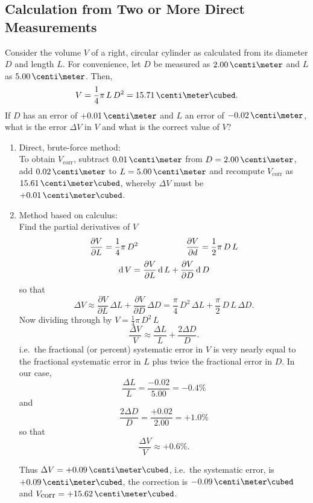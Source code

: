 \subsection{Calculation from Two or More Direct Measurements}

Consider the volume $V$ of a right, circular cylinder as calculated from its diameter $D$ and length $L$. For convenience, let $D$ be measured as $2.00\,\centi\meter$  and $L$ as $5.00\,\centi\meter$. Then,
\[
  V = \frac{1}{4} \pi \, L \, D^2 = 15.71\,\centi\meter\cubed.
\]
If $D$ has an error of $+0.01\,\centi\meter$ and $L$ an error of $-0.02\,\centi\meter$, what is the error $\Delta V$ in $V$ and what is the correct value of $V$?
\begin{enumerate}
\item Direct, brute-force method:\\
  To obtain $V_{\mbox{corr}}$, subtract $0.01\,\centi\meter$ from $D = 2.00\,\centi\meter$, add $0.02\,\centi\meter$ to $L = 5.00\,\centi\meter$ and recompute $V_{\mbox{corr}}$ as $15.61\,\centi\meter\cubed$, whereby $\Delta V$ must be $+0.01\,\centi\meter\cubed$.

\item Method based on calculus:\\
  Find the partial derivatives of $V$
  \[
    \frac{\partial V}{\partial L} =\frac{1}{4} \pi \, D^2   \hspace{2 cm}   \frac{\partial V}{\partial d} =\frac{1}{2} \pi \, D \, L
  \]
  \[
    {\rm d}\, V = \frac{\partial V}{\partial L} \, {\rm d}\, L + \frac{\partial V}{\partial D} \, {\rm d}\, D
  \]
  so that
  \[
    \Delta V \approx \frac{\partial V}{\partial L} \, \Delta L + \frac{\partial V}{\partial D} \, \Delta D = \frac{\pi}{4} \, D^2 \, \Delta L + \frac{\pi}{2} \, D \, L \, \Delta D.
  \]
  Now dividing through by $V = \frac{1}{4}\pi \, D^2 \, L$
  \[
    \frac{\Delta V}{V} \approx \frac{\Delta L}{L} + \frac{2 \Delta D}{D}.
  \]
  i.e.\ the fractional (or percent) systematic error in $V$ is very nearly equal to the fractional systematic error in $L$ plus twice the fractional error in $D$.  In our case,
  \[
    \frac{\Delta L}{L} = \frac{-0.02}{5.00} = -0.4 \%
  \]
  and
  \[
    \frac{2\Delta D}{D} = \frac{+0.02}{2.00} = +1.0 \%
  \]
  so that
  \[
    \frac{\Delta V}{V} \approx +0.6 \%.
  \]

  Thus $\Delta V = +0.09\,\centi\meter\cubed $, i.e.\ the systematic error, is  $+0.09\,\centi\meter\cubed$, the correction is $-0.09\,\centi\meter\cubed$ and $V_{\mbox{corr}} = +15.62\,\centi\meter\cubed $.
\end{enumerate}

